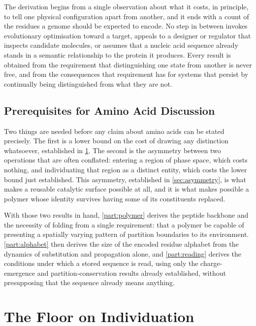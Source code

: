 \documentclass[11pt,twocolumn,a4paper]{article}
\theoremstyle{plain}
\theoremstyle{definition}
\theoremstyle{remark}
\begin{document}
The derivation begins from a single observation about what it costs, in
principle, to tell one physical configuration apart from another, and it
ends with a count of the residues a genome should be expected to encode. No
step in between invokes evolutionary optimisation toward a target, appeals
to a designer or regulator that inspects candidate molecules, or assumes
that a nucleic acid sequence already stands in a semantic relationship to
the protein it produces. Every result is obtained from the requirement that
distinguishing one state from another is never free, and from the
consequences that requirement has for systems that persist by continually
being distinguished from what they are not.

\subsection{Prerequisites for Amino Acid Discussion}

Two things are needed before any claim about amino acids can be stated
precisely. The first is a lower bound on the cost of drawing any distinction
whatsoever, established in \cref{sec:individuation}. The second is the
asymmetry between two operations that are often conflated: entering a region
of phase space, which costs nothing, and individuating that region as a
distinct entity, which costs the lower bound just established. This
asymmetry, established in \cref{sec:asymmetry}, is what makes a reusable
catalytic surface possible at all, and it is what makes possible a polymer
whose identity survives having some of its constituents replaced.

With those two results in hand, \cref{part:polymer} derives the peptide
backbone and the necessity of folding from a single requirement: that a
polymer be capable of presenting a spatially varying pattern of partition
boundaries to its environment. \cref{part:alphabet} then derives the size of
the encoded residue alphabet from the dynamics of substitution and
propagation alone, and \cref{part:reading} derives the conditions under
which a stored sequence is read, using only the charge-emergence and
partition-conservation results already established, without presupposing
that the sequence already means anything.

\section{The Floor on Individuation}
\label{sec:individuation}
\end{document}
